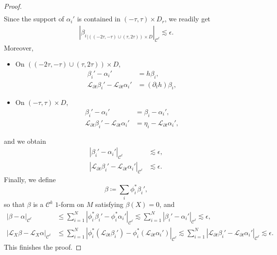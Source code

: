 \documentclass[letterpaper, 11pt]{article}
\numberwithin{equation}{section}
\begin{document}
\begin{proof}
\begin{align*}
\end{align*}
Since the support of $\alpha_i'$ is contained in $(-\tau, \tau) \times D_r$, we readily get
\begin{align*}
\left \vert {\beta_i}_{\vert ((-2\tau, -\tau) \cup (\tau, 2\tau))\times D} \right \vert_{\mathcal{C}^\ell} \lesssim \epsilon.
\end{align*}
Moreover, 
\begin{itemize}
\item On $((-2\tau, -\tau) \cup (\tau, 2\tau))\times D$,
	\begin{align*}
	\beta_i' - \alpha_i' &= h \beta_i,\\
	\mathcal{L}_{\partial t} \beta_i' - \mathcal{L}_{\partial t} \alpha_i' &= (\partial_t h) \beta_i,
	\end{align*}
\item On $(-\tau, \tau) \times D$,
	\begin{align*}
	\beta_i' - \alpha_i' &= \beta_i - \alpha_i',\\
	\mathcal{L}_{\partial t} \beta_i' - \mathcal{L}_{\partial t} \alpha_i' &=  \eta_i - \mathcal{L}_{\partial t} \alpha_i',
	\end{align*}
\end{itemize}
and we obtain
\begin{align*}
\left \vert \beta_i' - \alpha_i'  \right \vert_{\mathcal{C}^\ell} &\lesssim \epsilon, \\
\left \vert \mathcal{L}_{\partial t} \beta_i' -  \mathcal{L}_{\partial t} \alpha_i' \right \vert_{\mathcal{C}^\ell} & \lesssim \epsilon.
\end{align*}
Finally, we define
$$\beta \coloneqq \sum_i \phi_i^* \beta_i',$$
so that $\beta$ is a $\mathcal{C}^k$ $1$-form on $M$ satisfying $\beta(X) = 0$, and
\begin{align*}
\left \vert \beta - \alpha \right \vert_{\mathcal{C}^\ell} &\leq \sum_{i=1}^N \left \vert \phi_i^* \beta_i' - \phi_i^* \alpha_i' \right \vert_{\mathcal{C}^\ell} \lesssim \sum_{i=1}^N \left \vert \beta_i' - \alpha_i' \right \vert_{\mathcal{C}^\ell} \lesssim \epsilon,\\
\left \vert \mathcal{L}_X  \beta - \mathcal{L}_X  \alpha \right \vert_{\mathcal{C}^\ell} & \leq \sum_{i=1}^N \left \vert \phi_i^* (\mathcal{L}_{\partial t}  \beta_i') -  \phi_i^* (\mathcal{L}_{\partial t} \alpha_i') \right \vert_{\mathcal{C}^\ell} \lesssim \sum_{i=1}^N \left \vert \mathcal{L}_{\partial t} \beta_i' -  \mathcal{L}_{\partial t} \alpha_i' \right \vert_{\mathcal{C}^\ell} \lesssim \epsilon.
 \end{align*}
This finishes the proof.
\end{proof}
\end{document}
